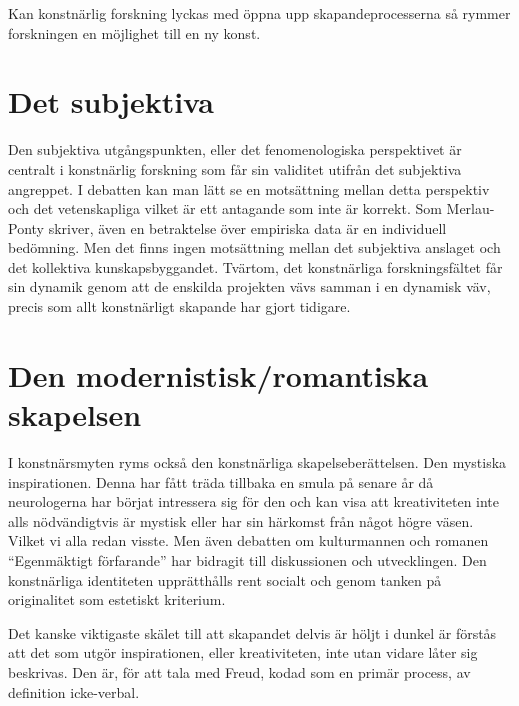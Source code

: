 \documentclass{article}
\begin{document}
Kan konstnärlig forskning lyckas med öppna upp skapandeprocesserna så rymmer forskningen en möjlighet till en ny konst.

\section{Det subjektiva}

Den subjektiva utgångspunkten, eller det fenomenologiska perspektivet är centralt i konstnärlig forskning som får sin validitet utifrån det subjektiva angreppet. I debatten kan man lätt se en motsättning mellan detta perspektiv och det vetenskapliga vilket är ett antagande som inte är korrekt. Som Merlau-Ponty skriver, även en betraktelse över empiriska data är en individuell bedömning. Men det finns ingen motsättning mellan det subjektiva anslaget och det kollektiva kunskapsbyggandet. Tvärtom, det konstnärliga forskningsfältet får sin dynamik genom att de enskilda projekten vävs samman i en dynamisk väv, precis som allt konstnärligt skapande har gjort tidigare. 


\section{Den modernistisk/romantiska skapelsen}
I konstnärsmyten ryms också den konstnärliga skapelseberättelsen. Den mystiska inspirationen. Denna har fått träda tillbaka en smula på senare år då neurologerna har börjat intressera sig för den och kan visa att kreativiteten inte alls nödvändigtvis är mystisk eller har sin härkomst från något högre väsen. Vilket vi alla redan visste. Men även debatten om kulturmannen och romanen ``Egenmäktigt förfarande'' har bidragit till diskussionen och utvecklingen.  Den konstnärliga identiteten upprätthålls rent socialt och genom tanken på originalitet som estetiskt kriterium. 

Det kanske viktigaste skälet till att skapandet delvis är höljt i dunkel är förstås att det som utgör inspirationen, eller kreativiteten, inte utan vidare låter sig beskrivas. Den är, för att tala med Freud, kodad som en primär process, av definition icke-verbal.


\end{document}
